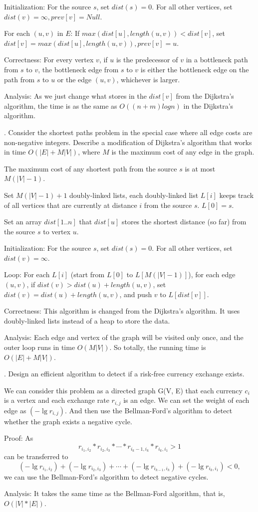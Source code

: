 \documentclass[11pt]{article}
\begin{document}
\noindent
Initialization: For the source $s$, set $dist(s)=0$. For all other vertices, set $dist(v)=\infty, prev[v]=Null$.

\noindent
For each $(u, v)$ in $E$: If $max(dist[u], length(u,v)) < dist[v]$,  set $dist[v]= max(dist[u], length(u,v)), prev[v]=u$.

\noindent
Correctness: For every vertex $v$, if $u$ is the predecessor of $v$ in a bottleneck path from $s$ to $v$, the bottleneck edge from $s$ to $v$ is either the bottleneck edge on the path from $s$ to $u$ or the edge $(u, v)$, whichever is larger.

\noindent
Analysis: As we just change what stores in the $dist[v]$ from the Dijkstra's algorithm, the time is as the same as $O((n+m)logn)$ in the Dijkstra's algorithm.


. Consider the shortest paths problem in the special case where all edge costs are non-negative integers. Describe a modification of Dijkstra's algorithm that works in time $O(|E|+M|V|)$, where $M$ is the maximum cost of any edge in the graph.

\noindent
The maximum cost of any shortest path from the source $s$ is at most $M(|V|-1)$.

\noindent
Set $M(|V|-1)+1$ doubly-linked lists, each doubly-linked list $L[i]$ keeps track of all vertices that are currently at distance $i$ from the source $s$. $L[0] = {s}$.

\noindent
Set an array $dist[1..n]$ that $dist[u]$ stores the shortest distance (so far) from the source $s$ to vertex $u$. 

\noindent
Initialization: For the source $s$, set $dist(s)=0$. For all other vertices, set $dist(v)=\infty$.

\noindent
Loop: For each $L[i]$ (start from $L[0]$ to $L[M(|V|-1)]$), for each edge $(u, v)$, if $dist(v) > dist(u) + length(u, v)$, set $dist(v) = dist(u) + length(u, v)$, and push $v$ to $L[dist[v]]$.

\noindent
Correctness: This algorithm is changed from the Dijkstra's algorithm. It uses doubly-linked lists instead of a heap to store the data.

\noindent
Analysis: Each edge and vertex of the graph will be visited only once, and the outer loop runs in time $O(M|V|)$. So totally, the running time is $O(|E|+M|V|)$.


. Design an efficient algorithm to detect if a risk-free currency exchange exists.

\noindent
We can consider this problem as a directed graph G(V, E) that each currency $c_i$ is a vertex and each exchange rate $r_{i,j}$ is an edge. We can set the weight of each edge as $(- \lg r_{i,j})$. And then use the Bellman-Ford's algorithm to detect whether the graph exists a negative cycle.

\noindent
Proof: 
As 
$$r_{i_1, i_2} * r_{i_2, i_3}*\cdots*r_{i_k-1,i_k} * r_{i_k,i_1} > 1$$
can be transferred to
$$(-\lg r_{i_1, i_2}) + ( -\lg r_{i_2, i_3}) + \cdots + (-\lg r_{i_{k-1},i_k}) + (-\lg r_{i_k,i_1}) < 0,$$ we can use the Bellman-Ford's algorithm to detect negative cycles.

\noindent
Analysis: It takes the same time as the Bellman-Ford algorithm, that is, $O(|V|*|E|)$.
\end{document}
